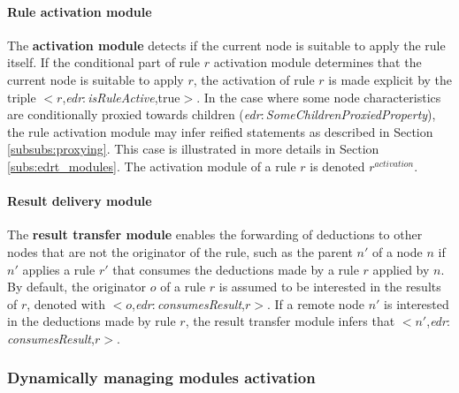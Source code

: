 \documentclass{iosart2c}
\newcommand{\namespace}[1]{\textit{#1$:$}}
\newcommand{\concept}[2]{\namespace{#1}\-\textit{#2}}
\newcommand{\triplet}[3]{$<$#1,\textit{#2},#3$>$}
\begin{document}
\paragraph{Rule activation module}
The \textbf{activation module} detects if the current node is suitable to apply the rule itself. 
If the conditional part of rule $r$ activation module determines that the current node is suitable to apply $r$, the activation of rule $r$ is made explicit by the triple \triplet{$r$}{\concept{edr}{is\-Rule\-Active}}{true}.
In the case where some node characteristics are conditionally proxied towards children (\concept{edr}{Some\-Children\-Proxied\-Property}), the rule activation module may infer reified statements as described in Section \textsection \ref{subsubs:proxying}. 
This case is illustrated in more details in Section \textsection \ref{subs:edrt_modules}.
The activation module of a rule $r$ is denoted $r^{activation}$.

\paragraph{Result delivery module}
The \textbf{result transfer module} enables the forwarding of deductions to other nodes that are not the originator of the rule, such as the parent $n'$ of a node $n$ if $n'$ applies a rule $r'$ that consumes the deductions made by a rule $r$ applied by $n$.
By default, the originator $o$ of a rule $r$ is assumed to be interested in the results of $r$, denoted with \triplet{$o$}{\concept{edr}{consumes\-Result}}{$r$}.
If a remote node $n'$ is interested in the deductions made by rule $r$, the result transfer module infers that \triplet{$n'$}{\concept{edr}{consumes\-Result}}{$r$}.

%	


\subsubsection{Dynamically managing modules activation}
\end{document}
